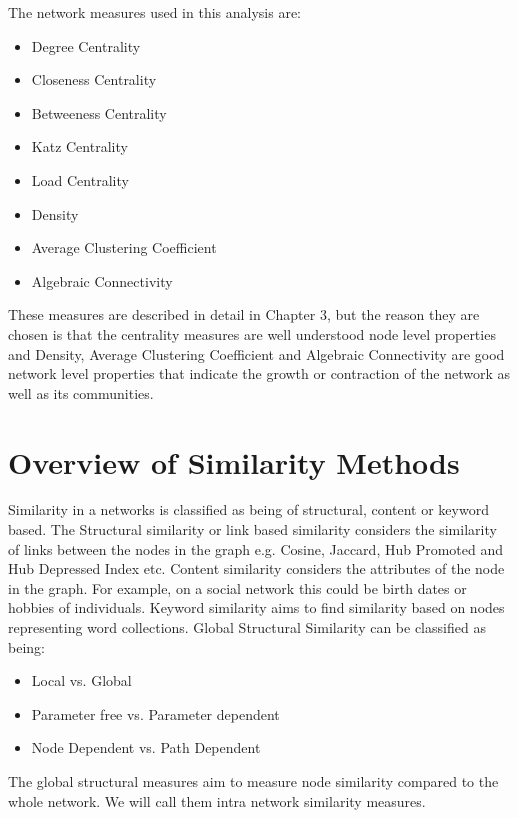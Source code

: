 The network measures used in this analysis are:

\begin{itemize}
    \item Degree Centrality
    \item Closeness Centrality
    \item Betweeness Centrality
    \item Katz Centrality
    \item Load Centrality
    \item Density
    \item Average Clustering Coefficient
    \item Algebraic Connectivity
\end{itemize}

These measures are described in detail in Chapter 3, but the reason they are chosen is that the centrality measures are well understood node level properties and Density, Average Clustering Coefficient and Algebraic Connectivity are good network level properties that indicate the growth or contraction of the network as well as its communities. 


\section{Overview of Similarity Methods}

Similarity in a networks is classified as being of structural, content or keyword based. The Structural similarity or link based similarity considers the similarity of links between the nodes in the graph e.g. Cosine, Jaccard, Hub Promoted and Hub Depressed Index etc. Content similarity considers the attributes of the node in the graph. For example, on a social network this could be birth dates or hobbies of individuals. Keyword similarity aims to find similarity based on nodes representing word collections. Global Structural Similarity can be classified as being: 

\begin{itemize}
    \item Local vs. Global
    \item Parameter free vs. Parameter dependent
    \item Node Dependent vs. Path Dependent
\end{itemize}

The global structural measures aim to measure node similarity compared to the whole network. We will call them intra network similarity measures. \cite{Rawashdeh2012}\\


